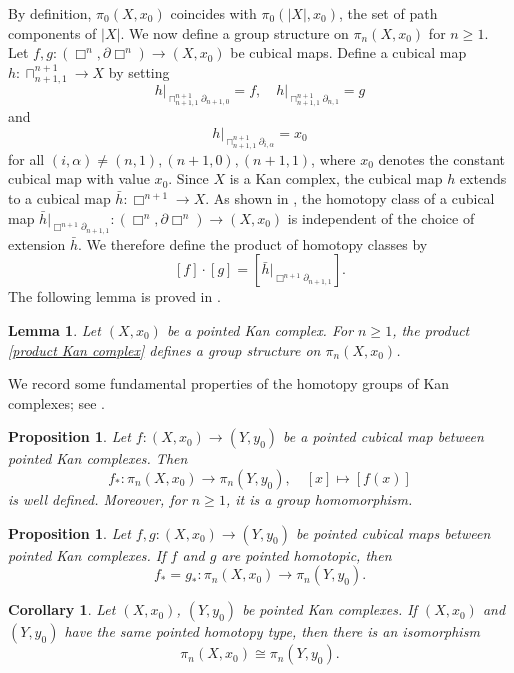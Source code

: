 \documentclass[oneside, 12pt]{amsart}
\numberwithin{equation}{section}
\theoremstyle{plain}
\newtheorem{proposition}[theorem]{Proposition}
\newtheorem{lemma}[theorem]{Lemma}
\newtheorem{corollary}[theorem]{Corollary}
\theoremstyle{definition}
\theoremstyle{remark}
\begin{document}
	
	
	By definition, $\pi_0(X,x_0)$ coincides with $\pi_0(|X|,x_0)$, the set of path components of $|X|$. We now define a group structure on $\pi_n(X,x_0)$ for $n\ge 1$. Let $f,g\colon(\Box^n,\partial\Box^n)\to(X,x_0)$ be cubical maps. Define a cubical map $h\colon\sqcap^{n+1}_{n+1,1}\to X$ by setting
	\[
	h\vert_{\sqcap^{n+1}_{n+1,1}\partial_{n+1,0}}=f,\quad h\vert_{\sqcap^{n+1}_{n+1,1}\partial_{n,1}}=g
	\]
	and
	\[
	h\vert_{\sqcap^{n+1}_{n+1,1}\partial_{i,\alpha}}=x_0
	\]
	for all $(i,\alpha)\ne(n,1),(n+1,0),(n+1,1)$, where $x_0$ denotes the constant cubical map with value $x_0$. Since $X$ is a Kan complex, the cubical map $h$ extends to a cubical map $\bar{h}\colon\Box^{n+1}\to X$. As shown in \cite{CK1}, the homotopy class of a cubical map $\bar{h}\vert_{\Box^{n+1}\partial_{n+1,1}}\colon(\Box^n,\partial\Box^n)\to(X,x_0)$ is independent of the choice of extension $\bar{h}$. We therefore define the product of homotopy classes by
	\begin{equation}
		\label{product Kan complex}
		[f]\cdot [g]=[\bar{h}\vert_{\Box^{n+1}\partial_{n+1,1}}].
	\end{equation}
	The following lemma is proved in \cite{CK1}.
	
	
	
	\begin{lemma}
		Let $(X,x_0)$ be a pointed Kan complex. For $n\ge 1$, the product \eqref{product Kan complex} defines a group structure on $\pi_n(X,x_0)$.
	\end{lemma}
	
	
	
	
	We record some fundamental properties of the homotopy groups of Kan complexes; see \cite[Theorem 3.17 and Proposition 4.3]{CK1}.
	
	
	
	\begin{proposition}
		Let $f\colon(X,x_0)\to(Y,y_0)$ be a pointed cubical map between pointed Kan complexes. Then
		\[
		f_*\colon\pi_n(X,x_0)\to\pi_n(Y,y_0),\quad[x]\mapsto[f(x)]
		\]
		is well defined. Moreover, for $n\ge 1$, it is a group homomorphism.
	\end{proposition}
	
	
	
	\begin{proposition}
		Let $f,g\colon(X,x_0)\to(Y,y_0)$ be pointed cubical maps between pointed Kan complexes. If $f$ and $g$ are pointed homotopic, then
		\[
		f_*=g_*\colon\pi_n(X,x_0)\to\pi_n(Y,y_0).
		\]
	\end{proposition}
	\begin{corollary}
			Let $(X,x_0)$, $(Y,y_0)$ be pointed Kan complexes. If $(X,x_0)$ and $(Y,y_0)$ have the same pointed homotopy type, then there is an isomorphism
			\[
			\pi_n(X,x_0)\cong\pi_n(Y,y_0).
			\]
	\end{corollary}
	
\end{document}
